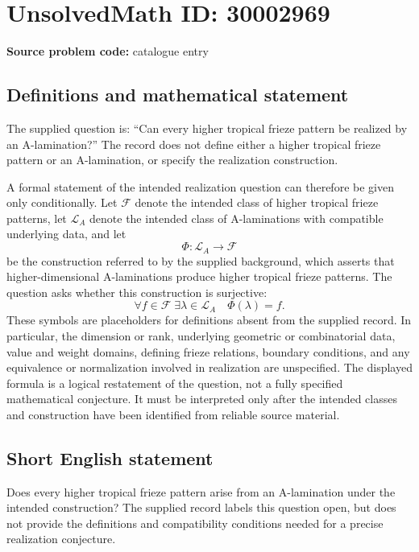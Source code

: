 \documentclass[11pt]{article}
\begin{document}
\section*{UnsolvedMath ID: 30002969}
\textbf{Source problem code:} catalogue entry
\subsection{Definitions and mathematical statement}
The supplied question is: ``Can every higher tropical frieze pattern be realized by an A-lamination?'' The record does not define either a higher tropical frieze pattern or an A-lamination, or specify the realization construction.

A formal statement of the intended realization question can therefore be given only conditionally. Let \(\mathcal{F}\) denote the intended class of higher tropical frieze patterns, let \(\mathcal{L}_{A}\) denote the intended class of A-laminations with compatible underlying data, and let
\[
\Phi\colon\mathcal{L}_{A}\longrightarrow\mathcal{F}
\]
be the construction referred to by the supplied background, which asserts that higher-dimensional A-laminations produce higher tropical frieze patterns. The question asks whether this construction is surjective:
\[
\forall f\in\mathcal{F}\;\exists\lambda\in\mathcal{L}_{A}
\quad\Phi(\lambda)=f.
\]
These symbols are placeholders for definitions absent from the supplied record. In particular, the dimension or rank, underlying geometric or combinatorial data, value and weight domains, defining frieze relations, boundary conditions, and any equivalence or normalization involved in realization are unspecified. The displayed formula is a logical restatement of the question, not a fully specified mathematical conjecture. It must be interpreted only after the intended classes and construction have been identified from reliable source material.
\subsection{Short English statement}
Does every higher tropical frieze pattern arise from an A-lamination under the intended construction? The supplied record labels this question open, but does not provide the definitions and compatibility conditions needed for a precise realization conjecture.
\end{document}
